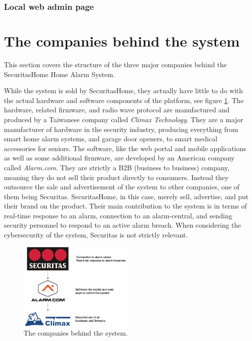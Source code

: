 \subsubsection{Local web admin page}

\section{The companies behind the system}
This section covers the structure of the three major companies behind the SecuritasHome Home Alarm System.

While the system is sold by SecuritasHome, they actually have little to do with the actual hardware and software components of the platform, see figure \ref{fig:company-structure}. The hardware, related firmware, and radio wave protocol are manufactured and produced by a Taiwanese company called \textit{Climax Technology}. They are a major manufacturer of hardware in the security industry, producing everything from smart home alarm systems, and garage door openers, to smart medical accessories for seniors. The software, like the web portal and mobile applications as well as some additional firmware, are developed by an American company called \textit{Alarm.com}. They are strictly a B2B (business to business) company, meaning they do not sell their product directly to consumers. Instead they outsource the sale and advertisement of the system to other companies, one of them being Securitas. SecuritasHome, in this case, merely sell, advertise, and put their brand on the product. Their main contribution to the system is in terms of real-time response to an alarm, connection to an alarm-central, and sending security personnel to respond to an active alarm breach. When considering the cybersecurity of the system, Securitas is not strictly relevant.
\begin{figure}[!ht]
  \begin{center}
    \includegraphics[width=0.5\textwidth]{images/company-structure.png}
  \end{center}
  \caption{The companies behind the system.}
  \label{fig:company-structure}
\end{figure}